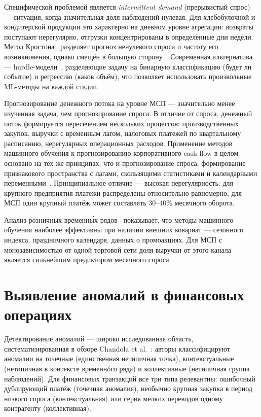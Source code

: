 Специфической проблемой является \textit{intermittent demand} (прерывистый спрос)~\cite{croston1972forecasting} --- ситуация, когда значительная доля наблюдений нулевая. Для хлебобулочной и кондитерской продукции это характерно на дневном уровне агрегации: возвраты поступают нерегулярно, отгрузки концентрированы в определённые дни недели. Метод Кростона~\cite{croston1972forecasting} разделяет прогноз ненулевого спроса и частоту его возникновения, однако смещён в большую сторону~\cite{syntetos2001bias}. Современная альтернатива --- hurdle-модели~\cite{lambert1992zero}, разделяющие задачу на бинарную классификацию (будет ли событие) и регрессию (каков объём), что позволяет использовать произвольные ML-методы на каждой стадии.

Прогнозирование денежного потока на уровне МСП --- значительно менее изученная задача, чем прогнозирование спроса. В отличие от спроса, денежный поток формируется пересечением нескольких процессов: производственных закупок, выручки с временным лагом, налоговых платежей по квартальному расписанию, нерегулярных операционных расходов. Применение методов машинного обучения к прогнозированию корпоративного cash flow в целом~\cite{lopezdeprado2018advances} основано на тех же принципах, что и прогнозирование спроса: формирование признакового пространства с лагами, скользящими статистиками и календарными переменными~\cite{ke2017lightgbm}. Принципиальное отличие --- высокая нерегулярность: для крупного предприятия платежи распределены относительно равномерно, для МСП один крупный платёж может составлять 30--40\% месячного оборота.

Анализ розничных временны́х рядов~\cite{fildes2019retail} показывает, что методы машинного обучения наиболее эффективны при наличии внешних ковариат --- сезонного индекса, праздничного календаря, данных о промоакциях. Для МСП с монозависимостью от одной торговой сети доля выручки от этого канала является сильнейшим предиктором месячного спроса.

\section{Выявление аномалий в финансовых операциях}

Детектирование аномалий --- широко исследованная область, систематизированная в обзоре Chandola et al.~\cite{chandola2009anomaly}: авторы классифицируют аномалии на точечные (единственная нетипичная точка), контекстуальные (нетипичная в контексте временнóго ряда) и коллективные (нетипичная группа наблюдений). Для финансовых транзакций все три типа релевантны: ошибочный дублирующий платёж (точечная аномалия), необычно крупная закупка в период низкого спроса (контекстуальная) или серия мелких переводов одному контрагенту (коллективная).

